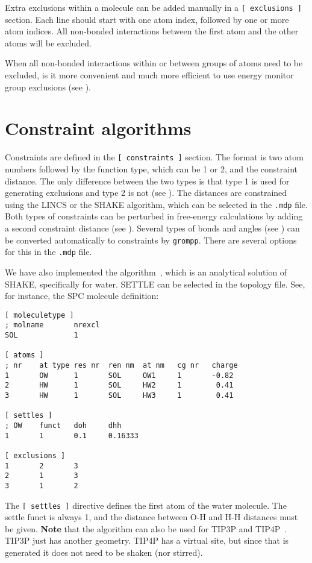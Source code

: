 Extra exclusions within a molecule can be added manually
in a {\tt [~exclusions~]} section. Each line should start with one
atom index, followed by one or more atom indices. All non-bonded
interactions between the first atom and the other atoms will be excluded.

When all non-bonded interactions within or between groups of atoms need
to be excluded, is it more convenient and much more efficient to use
energy monitor group exclusions (see ).

\section{Constraint algorithms}
\label{sec:constraints}
Constraints are defined in the {\tt [~constraints~]} section.
The format is two atom numbers followed by the function type,
which can be 1 or 2, and the constraint distance.
The only difference between the two types is that type 1 is used
for generating exclusions and type 2 is not (see ).
The distances are constrained using the LINCS or the SHAKE algorithm,
which can be selected in the {\tt *.mdp} file.
Both types of constraints can be perturbed in free-energy calculations
by adding a second constraint distance (see ).
Several types of bonds and angles (see ) can
be converted automatically to constraints by {\tt grompp}.
There are several options for this in the {\tt *.mdp} file.

We have also implemented the  algorithm~\cite{Miyamoto92},
which is an analytical solution of SHAKE, specifically for water. 
SETTLE can be selected in the topology file. See, for instance, the
SPC molecule definition:

{\small
\begin{verbatim}
[ moleculetype ]
; molname       nrexcl
SOL             1

[ atoms ]
; nr    at type res nr  ren nm  at nm   cg nr   charge
1       OW      1       SOL     OW1     1       -0.82
2       HW      1       SOL     HW2     1        0.41
3       HW      1       SOL     HW3     1        0.41

[ settles ]
; OW    funct   doh     dhh
1       1       0.1     0.16333

[ exclusions ]
1       2       3
2       1       3
3       1       2
\end{verbatim}}

The {\tt [~settles~]} directive defines the first atom of the water molecule.
The settle funct is always 1, and the distance between O-H and H-H distances
must be given. {\bf Note} that the algorithm can also be used
for TIP3P and TIP4P~\cite{Jorgensen83}.
TIP3P just has another geometry. TIP4P has a virtual site, but since 
that is generated it does not need to be shaken (nor stirred).

